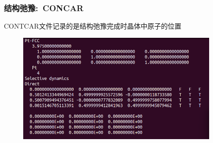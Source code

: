 %
\frame
{
	\frametitle{结构弛豫:~\textrm{CONCAR}}
\textrm{CONTCAR}文件记录的是结构弛豫完成时晶体中原子的位置%
\begin{figure}[h!]
\centering
\includegraphics[width=4.0in,viewport=0 0 580 230,clip]{Figures/Pt_FCC-CONTCAR.png}
\caption{\fontsize{6.2pt}{5.2pt}}%
\label{Pt_FCC:CONTCAR}
\end{figure}
{\fontsize{7.0pt}{5.2pt}}
}
\frame
